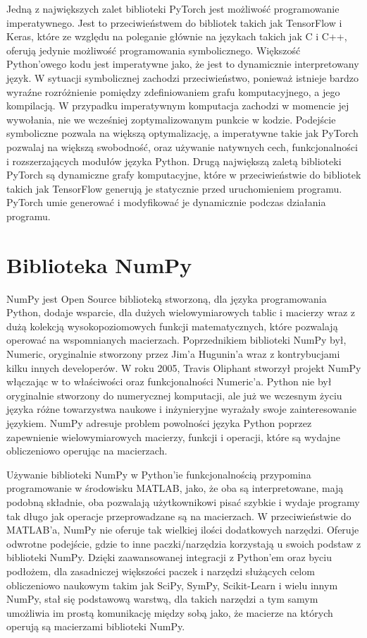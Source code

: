Jedną z największych zalet biblioteki PyTorch jest możliwość programowanie imperatywnego. Jest to przeciwieństwem do bibliotek takich jak TensorFlow i Keras, które ze względu na poleganie głównie na językach takich jak C i C++, oferują jedynie możliwość programowania symbolicznego. Większość Python'owego kodu jest imperatywne jako, że jest to dynamicznie interpretowany język. W sytuacji symbolicznej zachodzi przeciwieństwo, ponieważ istnieje bardzo wyraźne rozróżnienie pomiędzy zdefiniowaniem grafu komputacyjnego, a jego kompilacją. W przypadku imperatywnym komputacja zachodzi w momencie jej wywołania, nie we wcześniej zoptymalizowanym punkcie w kodzie. Podejście symboliczne pozwala na większą optymalizację, a imperatywne takie jak PyTorch pozwalaj na większą swobodność, oraz używanie natywnych cech, funkcjonalności i rozszerzających modułów języka Python.
Drugą największą zaletą biblioteki PyTorch są dynamiczne grafy komputacyjne, które w przeciwieństwie do bibliotek takich jak TensorFlow generują je statycznie przed uruchomieniem programu. PyTorch umie generować i modyfikować je dynamicznie podczas działania programu.

\clearpage

\section{Biblioteka NumPy}
NumPy \cite{PythonForDataAnalysis} \cite{SciPyAndNumPy} \cite{NumPyManual} \cite{WikipediaNumPy} jest Open Source biblioteką stworzoną, dla języka programowania Python, dodaje wsparcie, dla dużych wielowymiarowych tablic i macierzy wraz z dużą kolekcją wysokopoziomowych funkcji matematycznych, które pozwalają operować na wspomnianych macierzach. Poprzednikiem biblioteki NumPy był, Numeric, oryginalnie stworzony przez Jim'a Hugunin'a wraz z kontrybucjami kilku innych developerów. W roku 2005, Travis Oliphant stworzył projekt NumPy włączając w to właściwości oraz funkcjonalności Numeric'a.
Python nie był oryginalnie stworzony do numerycznej komputacji, ale już we wczesnym życiu języka różne towarzystwa naukowe i inżynieryjne wyrażały swoje zainteresowanie językiem.
NumPy adresuje problem powolności języka Python poprzez zapewnienie wielowymiarowych macierzy, funkcji i operacji, które są wydajne obliczeniowo operując na macierzach.

Używanie biblioteki NumPy w Python'ie funkcjonalnością przypomina programowanie w środowisku MATLAB, jako, że oba są interpretowane, mają podobną składnie, oba pozwalają użytkownikowi pisać szybkie i wydaje programy tak długo jak operacje przeprowadzane są na macierzach. W przeciwieństwie do MATLAB'a, NumPy nie oferuje tak wielkiej ilości dodatkowych narzędzi. Oferuje odwrotne podejście, gdzie to inne paczki/narzędzia korzystają u swoich podstaw z biblioteki NumPy. Dzięki zaawansowanej integracji z Python'em oraz byciu podłożem, dla zasadniczej większości paczek i narzędzi służących celom obliczeniowo naukowym takim jak SciPy, SymPy, Scikit-Learn i wielu innym NumPy, stał się podstawową warstwą, dla takich narzędzi a tym samym umożliwia im prostą komunikację między sobą jako, że macierze na których operują są macierzami biblioteki NumPy.

